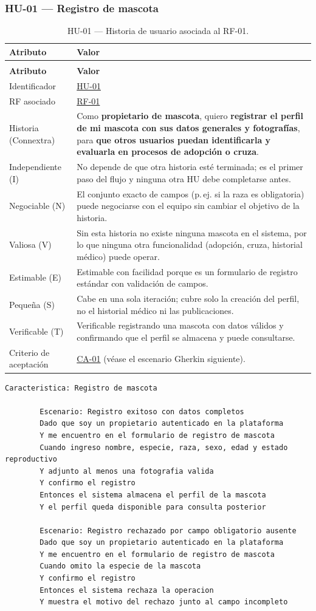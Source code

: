\documentclass[journal,onecolumn]{IEEEtran}
\makeatletter
\newenvironment{atributos}[2]{%
	\small
	\begin{longtable}{@{}>{\raggedright\arraybackslash}p{4.2cm} >{\raggedright\arraybackslash}p{11.2cm}@{}}
		\caption{#2}\label{tab:#1}\\
		\toprule
		\textbf{Atributo} & \textbf{Valor} \\
		\midrule
		\endfirsthead
		\multicolumn{2}{@{}l}{\small\itshape (continuación)}\\
		\toprule
		\textbf{Atributo} & \textbf{Valor} \\
		\midrule
		\endhead
		\bottomrule
		\endlastfoot
	}{%
	\end{longtable}
	\normalsize
}
\makeatother
\begin{document}
	\subsubsection{HU-01 --- Registro de mascota}
	
	\begin{atributos}{HU-01}{HU-01 --- Historia de usuario asociada al RF-01.}
		Identificador & \hyperref[tab:HU-01]{HU-01} \\
		RF asociado & \hyperref[tab:RF-01]{RF-01} \\
		Historia (Connextra) & Como \textbf{propietario de mascota}, quiero \textbf{registrar el perfil de mi mascota con sus datos generales y fotografías}, para \textbf{que otros usuarios puedan identificarla y evaluarla en procesos de adopción o cruza}. \\
		Independiente (I) & No depende de que otra historia esté terminada; es el primer paso del flujo y ninguna otra HU debe completarse antes. \\
		Negociable (N) & El conjunto exacto de campos (p.\,ej. si la raza es obligatoria) puede negociarse con el equipo sin cambiar el objetivo de la historia. \\
		Valiosa (V) & Sin esta historia no existe ninguna mascota en el sistema, por lo que ninguna otra funcionalidad (adopción, cruza, historial médico) puede operar. \\
		Estimable (E) & Estimable con facilidad porque es un formulario de registro estándar con validación de campos. \\
		Pequeña (S) & Cabe en una sola iteración; cubre solo la creación del perfil, no el historial médico ni las publicaciones. \\
		Verificable (T) & Verificable registrando una mascota con datos válidos y confirmando que el perfil se almacena y puede consultarse. \\
		Criterio de aceptación & \hyperref[lst:ca01]{CA-01} (véase el escenario Gherkin siguiente). \\
	\end{atributos}
	
	\begin{lstlisting}[style=gherkin,caption={CA-01 --- Escenario de aceptación de la historia HU-01.},label={lst:ca01}]
		Caracteristica: Registro de mascota
		
		Escenario: Registro exitoso con datos completos
		Dado que soy un propietario autenticado en la plataforma
		Y me encuentro en el formulario de registro de mascota
		Cuando ingreso nombre, especie, raza, sexo, edad y estado reproductivo
		Y adjunto al menos una fotografia valida
		Y confirmo el registro
		Entonces el sistema almacena el perfil de la mascota
		Y el perfil queda disponible para consulta posterior
		
		Escenario: Registro rechazado por campo obligatorio ausente
		Dado que soy un propietario autenticado en la plataforma
		Y me encuentro en el formulario de registro de mascota
		Cuando omito la especie de la mascota
		Y confirmo el registro
		Entonces el sistema rechaza la operacion
		Y muestra el motivo del rechazo junto al campo incompleto
	\end{lstlisting}
	
\end{document}
